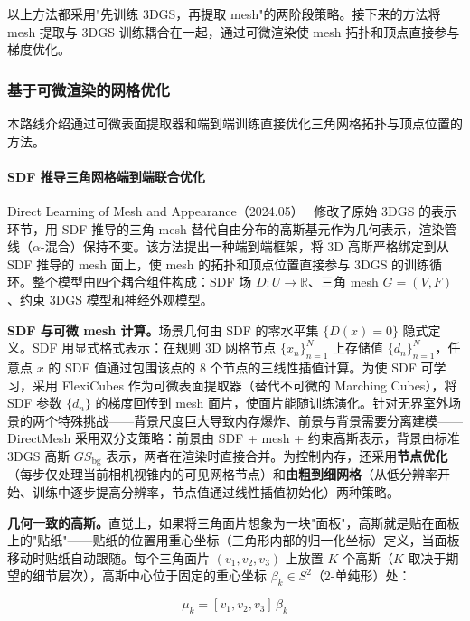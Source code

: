 以上方法都采用"先训练 3DGS，再提取 mesh"的两阶段策略。接下来的方法将 mesh 提取与 3DGS 训练耦合在一起，通过可微渲染使 mesh 拓扑和顶点直接参与梯度优化。

\subsubsection{基于可微渲染的网格优化}
\label{subsec:04_4_3}

本路线介绍通过可微表面提取器和端到端训练直接优化三角网格拓扑与顶点位置的方法。

\paragraph{SDF 推导三角网格端到端联合优化}

Direct Learning of Mesh and Appearance（2024.05）~\cite{2405_06945} 修改了原始 3DGS 的表示环节，用 SDF 推导的三角 mesh 替代自由分布的高斯基元作为几何表示，渲染管线（$\alpha$-混合）保持不变。该方法提出一种端到端框架，将 3D 高斯严格绑定到从 SDF 推导的 mesh 面上，使 mesh 的拓扑和顶点位置直接参与 3DGS 的训练循环。整个模型由四个耦合组件构成：SDF 场 $D: U \to \mathbb{R}$、三角 mesh $G=(V,F)$、约束 3DGS 模型和神经外观模型。

\textbf{SDF 与可微 mesh 计算。}场景几何由 SDF 的零水平集 $\{D(x)=0\}$ 隐式定义。SDF 用显式格式表示：在规则 3D 网格节点 $\{x_n\}_{n=1}^N$ 上存储值 $\{d_n\}_{n=1}^N$，任意点 $x$ 的 SDF 值通过包围该点的 8 个节点的三线性插值计算。为使 SDF 可学习，采用 FlexiCubes 作为可微表面提取器（替代不可微的 Marching Cubes），将 SDF 参数 $\{d_n\}$ 的梯度回传到 mesh 面片，使面片能随训练演化。针对无界室外场景的两个特殊挑战——背景尺度巨大导致内存爆炸、前景与背景需要分离建模——DirectMesh 采用双分支策略：前景由 SDF + mesh + 约束高斯表示，背景由标准 3DGS 高斯 $GS_{\text{bg}}$ 表示，两者在渲染时直接合并。为控制内存，还采用\textbf{节点优化}（每步仅处理当前相机视锥内的可见网格节点）和\textbf{由粗到细网格}（从低分辨率开始、训练中逐步提高分辨率，节点值通过线性插值初始化）两种策略。

\textbf{几何一致的高斯。}直觉上，如果将三角面片想象为一块"面板"，高斯就是贴在面板上的"贴纸"——贴纸的位置用重心坐标（三角形内部的归一化坐标）定义，当面板移动时贴纸自动跟随。每个三角面片 $(v_1, v_2, v_3)$ 上放置 $K$ 个高斯（$K$ 取决于期望的细节层次），高斯中心位于固定的重心坐标 $\beta_k \in S^2$（2-单纯形）处：

\begin{equation}
\mu_k = [v_1, v_2, v_3]\, \beta_k
\end{equation}

